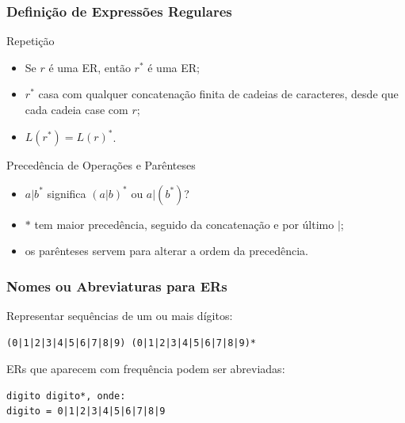 \documentclass[table]{beamer}
\begin{document}
\begin{frame}
   \frametitle{Definição de Expressões Regulares}
   \begin{block}{Repetição}
      \begin{itemize}
         \item Se $r$ é uma ER, então $r^{*}$ é uma ER;
	 \item $r^{*}$ casa com qualquer concatenação finita de cadeias de caracteres, desde que cada cadeia case com $r$;
	 \item $L(r^{*})=L(r)^{*}$.
      \end{itemize}
   \end{block}
   \begin{block}{Precedência de Operações e Parênteses}
      \begin{itemize}
         \item $a|b^{*}$ significa $(a|b)^{*}$ ou $a|(b^{*})$?
	 \item $*$ tem maior precedência, seguido da concatenação e por último $|$;
	 \item os parênteses servem para alterar a ordem da precedência.
      \end{itemize}
   \end{block}
\end{frame}

\begin{frame}[fragile]
   \frametitle{Nomes ou Abreviaturas para ERs}
   Representar sequências de um ou mais dígitos:
   \begin{verbatim}
(0|1|2|3|4|5|6|7|8|9) (0|1|2|3|4|5|6|7|8|9)*
   \end{verbatim}
   ERs que aparecem com frequência podem ser abreviadas:
   \begin{verbatim}
digito digito*, onde:
digito = 0|1|2|3|4|5|6|7|8|9
   \end{verbatim}
\end{frame}
\end{document}
